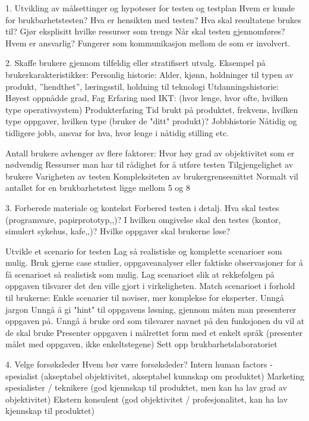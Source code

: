 1. Utvikling av målsettinger og hypoteser for testen og testplan 
	Hvem er kunde for brukbarhetstesten? 
	Hva er hensikten med testen? 
	Hva skal resultatene brukes til? 
	Gjør eksplisitt hvilke ressurser som trengs 
	Når skal testen gjennomføres? 
	Hvem er ansvarlig? 
	Fungerer som kommunikasjon mellom de som er involvert.


2. Skaffe brukere gjennom tilfeldig eller stratifisert utvalg. 
	Eksempel på brukerkarakteristikker: 
		Personlig historie: 
			Alder, kjønn, holdninger til typen av produkt, ”hendthet”, læringsstil, holdning til teknologi 
		Utdanningshistorie: 
			Høyest oppnådde grad, Fag 
		Erfaring med IKT: 
			(hvor lenge, hvor ofte, hvilken type operativsystem) 
		Produkterfaring 
			Tid brukt på produktet, frekvens, hvilken type oppgaver, hvilken type 
			(bruker de "ditt" produkt)? 
		Jobbhistorie 
			Nåtidig og tidligere jobb, ansvar for hva, hvor lenge i nåtidig stilling etc.


 	Antall brukere avhenger av flere faktorer: 
		Hvor høy grad av objektivitet som er nødvendig 
		Ressurser man har til rådighet for å utføre testen 
		Tilgjengelighet av brukere 
		Varigheten av testen 
		Kompleksiteten av brukergrensesnittet 
		Normalt vil antallet for en brukbarhetstest ligge mellom 5 og 8 

3. Forberede materiale og kontekst 
	Forbered testen i detalj. 
	Hva skal testes (programvare, papirprototyp,,)? 
	I hvilken omgivelse skal den testes (kontor, simulert sykehus, kafe,,)? 
	Hvilke oppgaver skal brukerne løse?

	Utvikle et scenario for testen 
		Lag så realistiske og komplette scenarioer som mulig. Bruk gjerne case studier, oppgaveanalyser eller faktiske observasjoner for å få scenarioet så realistisk som mulig. 
		Lag scenarioet slik at rekkefølgen på oppgaven tilsvarer det den ville gjort i virkeligheten. 
		Match scenarioet i forhold til brukerne: Enkle scenarier til noviser, mer komplekse for eksperter. 
		Unngå jargon 
		Unngå å gi "hint" til oppgavens løsning, gjennom måten man presenterer oppgaven på. Unngå å bruke ord som tilsvarer navnet på den funksjonen du vil at de skal bruke 
		Presenter oppgaven i målrettet form med et enkelt språk (presenter målet med oppgaven, ikke enkeltstegene)
		Sett opp brukbarhetslaboratoriet

4. Velge forsøksleder 
	Hvem bør være forsøksleder? 
	Intern human factors - spesialist (akseptabel objektivitet, akseptabel kunnskap om produktet) 
	Marketing spesialister / teknikere (god kjennskap til produktet, men kan ha lav grad av objektivitet) 
	Ekstern konsulent (god objektivitet / profesjonalitet, kan ha lav kjennskap til produktet) 

